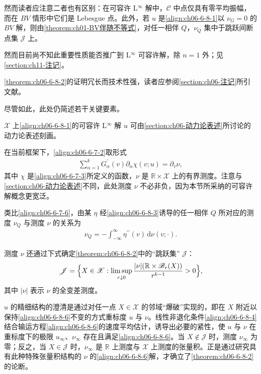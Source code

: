 \documentclass[../../main.tex]{subfiles}
\begin{document}
然而读者应注意二者也有区别：在可容许 L$^{\infty}$ 解中，$\mathscr{C}$ 中点仅具有零平均振幅，而在 $BV$ 情形中它们是 Lebesgue 点。此外，若 $u$ 是\eqref{align:ch06-6-8-1}以 $\nu_{G}=0$ 的 $BV$ 解，则由\cref{theorem:ch01-BV伴随不等式}，对任一相伴 $Q$，$\nu_{Q}$ 集中于跳跃间断点集 $\mathscr{J}$ 上。

然而目前尚不知此重要性质能否推广到 L$^{\infty}$ 可容许解，除 $n=1$ 外；见\cref{section:ch11-注记}。


\cref{theorem:ch06-6-8-2}的证明冗长而技术性强，读者应参阅\cref{section:ch06-注记}所引文献。

尽管如此，此处仍简述若干关键要素。

$\mathscr{X}$ 上\eqref{align:ch06-6-8-1}的可容许 L$^{\infty}$ 解 $u$ 可由\cref{section:ch06-动力论表述}所讨论的动力论表述刻画。

在当前框架下，\eqref{align:ch06-6-7-2}取形式
\begin{align}
\sum_{\alpha=1}^{k}G_{\alpha}^{\prime}(v)\partial_{\alpha}\chi(v;u)=\partial_{v}\nu,
\label{align:ch06-6-8-6}
\end{align}
其中 $\chi$ 是\eqref{align:ch06-6-7-3}所定义的函数，$\nu$ 是 $\mathbb{R}\times\mathscr{X}$ 上的有界测度。注意与\cref{section:ch06-动力论表述}不同，此处测度 $\nu$ 不必非负，因为本节所采纳的可容许解概念更宽泛。


类比\eqref{align:ch06-6-7-6}，由某 $\eta$ 经\eqref{align:ch06-6-8-3}诱导的任一相伴 $Q$ 所对应的测度 $\nu_{Q}$ 与测度 $\nu$ 的关系为
\begin{align}
\nu_{Q}=-\int_{-\infty}^{\infty}\eta^{\prime\prime}(v)\,\mathrm{d}\nu(v;\cdot).
\label{align:ch06-6-8-7}
\end{align}

测度 $\nu$ 还通过下式确定\cref{theorem:ch06-6-8-2}中的“跳跃集” $\mathscr{J}$：
\begin{align}
\mathscr{J}=\Bigl{\{}X\in\mathscr{X}:\limsup_{r\downarrow 0}\frac{|\nu|(\mathbb{R}\times\mathscr{B}_{r}(X))}{r^{k-1}}>0\Bigr{\}},
\label{align:ch06-6-8-8}
\end{align}
其中 $|\nu|$ 表示 $\nu$ 的全变差测度。

$u$ 的精细结构的澄清是通过对任一点 $X\in\mathscr{X}$ 的邻域“爆破”实现的，即在 $X$ 附近以保持\eqref{align:ch06-6-8-6}不变的方式重标度 $u$ 与 $\nu$。线性非退化条件\eqref{align:ch06-6-8-4}结合输运方程\eqref{align:ch06-6-8-6}的速度平均估计，诱导出必要的紧性，使 $u$ 与 $\nu$ 在重标度下的极限 $u_{\infty}$、$\nu_{\infty}$ 存在且满足\eqref{align:ch06-6-8-6}。当 $X\notin\mathscr{J}$ 时，测度 $\nu_{\infty}$ 为零；反之，当 $X\in\mathscr{J}$ 时，$\nu_{\infty}$ 是 $\mathbb{R}$ 上测度与 $\mathscr{X}$ 上测度的张量积。正是通过研究具有此种特殊张量积结构的 $\nu$ 的\eqref{align:ch06-6-8-6}解，才确立了\cref{theorem:ch06-6-8-2}的论断。
\end{document}
